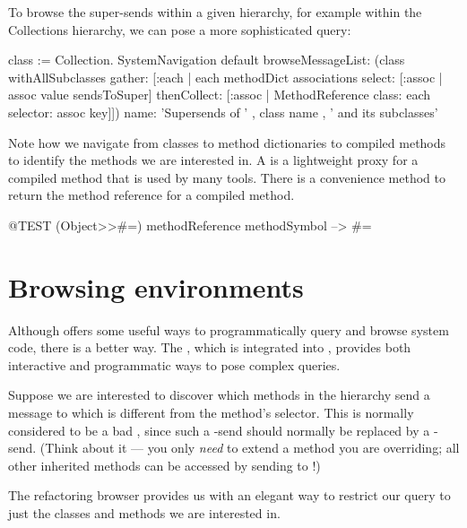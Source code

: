 \documentclass[a4paper,10pt,twoside]{book}
\begin{document}
To browse the super-sends within a given hierarchy, for example within the Collections hierarchy, we can pose a more sophisticated query:
\begin{code}{}
class := Collection.
SystemNavigation default
  browseMessageList: (class withAllSubclasses gather: [:each |
    each methodDict associations
      select: [:assoc | assoc value sendsToSuper]
      thenCollect: [:assoc | MethodReference class: each selector: assoc key]])
  name: 'Supersends of ' , class name , ' and its subclasses'
\end{code}
Note how we navigate from classes to method dictionaries to compiled methods to identify the methods we are interested in.
A  is a lightweight proxy for a compiled method that is used by many tools.
There is a convenience method  to return the method reference for a compiled method.
\begin{code}{@TEST}
(Object>>#=) methodReference methodSymbol --> #=
\end{code}

\section{Browsing environments}

Although  offers some useful ways to programmatically query and browse system code, there is a better way.  The , which is integrated into \pharo, provides both interactive and programmatic ways to pose complex queries.

Suppose we are interested to discover which methods in the  hierarchy send a message to \super which is different from the method's selector.
This is normally considered to be a bad , since such a \super-send should normally be replaced by a \self-send. (Think about it --- you only \emph{need} \super to extend a method you are overriding; all other inherited methods can be accessed by sending to \self!)

The refactoring browser provides us with an elegant way to restrict our query to just the classes and methods we are interested in.

\end{document}
